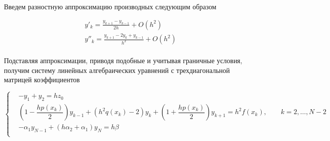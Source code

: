 Введем разностную аппроксимацию производных следующим образом

$$\begin{aligned}
    & y'_k = \frac{y_{k+1} - y_{k-1}}{2h} + O(h^2) \\
    & y''_k = \frac{y_{k+1} - 2y_k + y_{k-1}}{h^2} + O(h^2) \\ 
\end{aligned}$$

Подставляя аппроксимации, приводя подобные и учитывая граничные
условия, получим систему линейных алгебраических
уравнений с трехдиагональной матрицей коэффициентов

$$\begin{cases}
    &-y_1 + y_2 = hz_0 \\
    &\left(1 - \dfrac{hp(x_k)}{2}\right)y_{k-1} + (h^2q(x_k) - 2)y_k
        + \left(1 + \dfrac{hp(x_k)}{2}\right
        
        )y_{k+1} = h^2f(x_k),
        \qquad k = 2,\dots,N-2 \\
    &-\alpha_1 y_{N-1} + (h\alpha_2 + \alpha_1)y_N = h\beta \\
\end{cases}$$

\pagebreak